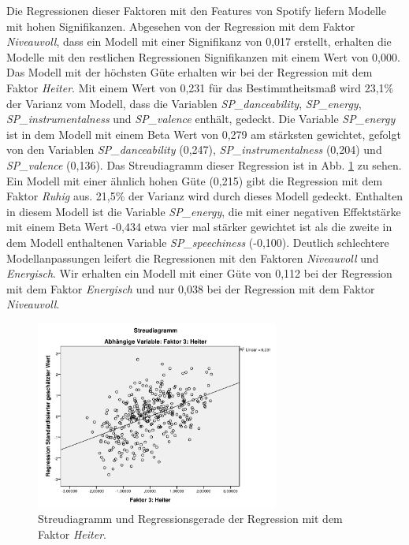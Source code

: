Die Regressionen dieser Faktoren mit den Features von Spotify liefern Modelle mit hohen Signifikanzen. Abgesehen von der Regression mit dem Faktor \textit{Niveauvoll}, dass ein Modell mit einer Signifikanz von 0,017 erstellt, erhalten die Modelle mit den restlichen Regressionen Signifikanzen mit einem Wert von 0,000. 
Das Modell mit der höchsten Güte erhalten wir bei der Regression mit dem Faktor \textit{Heiter}.
Mit einem Wert von 0,231 für das Bestimmtheitsmaß wird 23,1\% der Varianz vom Modell, dass die Variablen \textit{SP\_danceability}, \textit{SP\_energy}, \textit{SP\_instrumentalness} und \textit{SP\_valence} enthält, gedeckt.
Die Variable \textit{SP\_energy} ist in dem Modell mit einem Beta Wert von 0,279 am stärksten gewichtet, gefolgt von den Variablen \textit{SP\_danceability} (0,247),  \textit{SP\_instrumentalness} (0,204) und \textit{SP\_valence} (0,136).
Das Streudiagramm dieser Regression ist in Abb. \ref{fig:Faktor3} zu sehen.    
Ein Modell mit einer ähnlich hohen Güte (0,215) gibt die Regression mit dem Faktor \textit{Ruhig} aus.
21,5\% der Varianz wird durch dieses Modell gedeckt.
Enthalten in diesem Modell ist die Variable \textit{SP\_energy}, die mit einer negativen Effektstärke mit einem Beta Wert -0,434 etwa vier mal stärker gewichtet ist als die zweite in dem Modell enthaltenen Variable \textit{SP\_speechiness} (-0,100).
Deutlich schlechtere Modellanpassungen leifert die Regressionen mit den Faktoren \textit{Niveauvoll} und \textit{Energisch}.
Wir erhalten ein Modell mit einer Güte von 0,112 bei der Regression mit dem Faktor \textit{Energisch} und nur 0,038 bei der Regression mit dem Faktor \textit{Niveauvoll}.


\begin{figure}[hbt]
    \begin{center}
        \includegraphics[width=8cm]{images/StreudiagrammFak3.pdf}
    \end{center}
    \caption{Streudiagramm und Regressionsgerade der Regression mit dem Faktor \textit{Heiter}.}
    \label{fig:Faktor3}
\end{figure}

